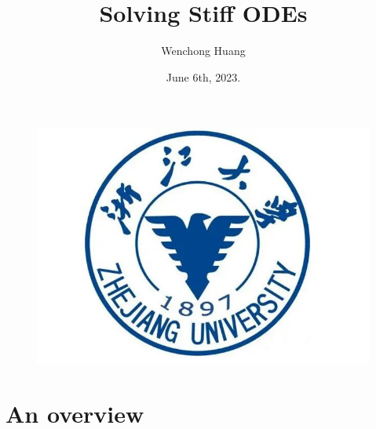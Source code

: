 \documentclass[9pt]{beamer}
\title{Solving Stiff ODEs}
\institute{Department of Mathematics, Zhejiang University.}
\date{June 6th, 2023.}
\begin{document}
\author{Wenchong Huang}

\kaishu
\begin{frame}
    \titlepage
    \begin{figure}[htpb]
        \begin{center}
            \vspace*{-0.5cm}
            \includegraphics[width=0.2\linewidth]{pic/zju.jpg}
        \end{center}
    \end{figure}
\end{frame}

\begin{frame}
    \tableofcontents[sectionstyle=show,subsectionstyle=show/shaded/hide,subsubsectionstyle=show/shaded/hide]
\end{frame}

\section{An overview}
\end{document}
